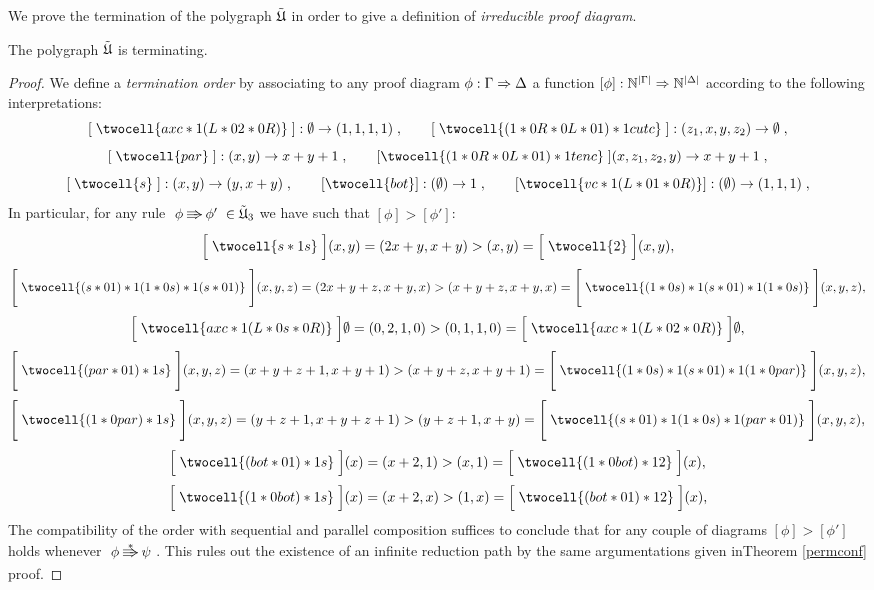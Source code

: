 \documentclass[a4paper]{article}
\begin{document}
We  prove the termination of the polygraph ${\tilde{\mathfrak{U}}}$ in order to give a definition of \emph{irreducible proof diagram}.


\begin{theorem}\label{termlltc}
The polygraph ${\tilde{\mathfrak{U}}}$ is terminating.
\begin{proof}
We define a \emph{termination order} \cite{GuirTer} by associating to 
any proof diagram $\phi: \Gamma \Rightarrow \Delta$  a function $[ \phi] : \mathbb N ^{|\Gamma|} \Rightarrow \mathbb N ^{|\Delta|}$ according to the following interpretations:
$$
[\;\twocell{axc *1 (L *0 2 *0 R)}\;] : \emptyset \fr (1,1,1,1) \; , \qquad 
[\;\twocell{(1 *0 R *0 L *0 1) *1 cutc}\;]: (z_1,x,y,z_2)\fr \emptyset\; ,
$$
$$[\; \twocell{par}\; ] : (x,y)\fr x+y+1 \; ,\qquad 
[\twocell{(1 *0 R *0 L *0 1) *1 tenc}\; ] (x,z_1, z_2,y)\fr x+y+1 \; ,
$$
$$
[\;\twocell{s}\;]: (x,y)\fr (y, x+y) \; ,\qquad 
[\twocell{bot}]:(\emptyset )\fr 1 \; ,\qquad 
[\twocell{vc *1 ( L *0 1 *0 R)}]:(\emptyset )\fr (1,1,1) \; ,
$$
In particular, for any rule $\xymatrix@C=1em{\phi \ar@3[r]& \phi'}\in \Mlltc_3$ we have such that $[ \phi] > [{\phi'}]$:
{\small
$$
\Big[\; \twocell{s *1 s }\;\Big] (x,y)= (2x+y,x+y)> (x,y)=\Big[\;\twocell{2}\;\Big](x,y), 
$$
$$
\Bigg[\;{\twocell{(s *0 1)*1 (1 *0 s)*1 (s *0 1)}}\;\Bigg](x,y,z)=(2x+y+z, x+y,x)> (x+y+z,x+y,x)=\Bigg[\;{\twocell{ (1 *0 s)*1 (s *0 1)*1 (1 *0 s) }}\;\Bigg](x,y,z),
$$
$$
\Big[\; \twocell{axc *1 (L *0 s *0 R) }\;\Big] \emptyset= (0,2,1,0)> (0,1,1,0)=\Big[\;\twocell{axc *1 (L *0 2 *0 R)}\;\Big]\emptyset, 
$$
$$
\Bigg[\; \twocell{(par *0 1)*1 s}\;\Bigg](x,y,z)= (x+y+z+1, x+y+1) > (x+y+z,x+y+1)=\Bigg[\; \twocell{ (1 *0 s)*1 (s *0 1)*1 (1 *0 par) }\;\Bigg](x,y,z),
$$
$$
\Bigg[\; \twocell{(1 *0 par)*1 s}\;\Bigg](x,y,z)= (y+z+1, x+y+z+1) > (y+z+1,x+y)=\Bigg[\; \twocell{  (s *0 1)*1 (1 *0 s)*1(par *0 1) }\;\Bigg](x,y,z),
$$
$$
\Big[\; \twocell{(bot *0 1) *1 s }\;\Big](x)= (x+2,1) > (x,1)=\Big[\;\twocell{(1 *0 bot) *1 2}\;\Big] (x),
$$
$$
\Big[\;\twocell{(1 *0 bot) *1 s}\;\Big](x)= (x+2,x)> (1,x)=\Big[\; \twocell{(bot *0 1) *1 2}\;\Big](x),
$$
}
The compatibility of the order with sequential and parallel composition suffices to conclude that for any couple of  diagrams $[ \phi] > [ {\phi'}]$ holds whenever $\xymatrix@C=1em{ \phi \ar@3[r]^{*} & \psi}$. This rules out the existence of an infinite reduction path by the same argumentations given inTheorem \ref{permconf} proof.
\end{proof}
\end{theorem}
\end{document}
